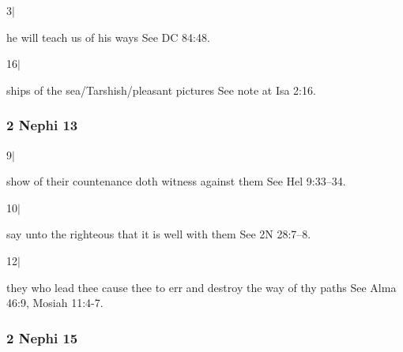 		\begin{compactdesc}

		\item[3$\vert$]
		\begin{compactdesc}
		\item[he will teach us of his ways] See DC 84:48.
		\end{compactdesc}
		
		\item[16$\vert$]
		\begin{compactdesc}
		\item[ships of the sea/Tarshish/pleasant pictures] See note at Isa 2:16.
		\end{compactdesc}

		\end{compactdesc}

	\subsubsection{2 Nephi 13} %

		\begin{compactdesc}

		\item[9$\vert$]
		\begin{compactdesc}
		\item[show of their countenance doth witness against them] See Hel 9:33--34.
		\end{compactdesc}

		\item[10$\vert$]
		\begin{compactdesc}
		\item[say unto the righteous that it is well with them] See 2N 28:7--8.
		\end{compactdesc}

		\item[12$\vert$]
		\begin{compactdesc}
		\item[they who lead thee cause thee to err and destroy the way of thy paths] See Alma 46:9, Mosiah 11:4-7.
		\end{compactdesc}

		\end{compactdesc}

	\subsubsection{2 Nephi 15} %

